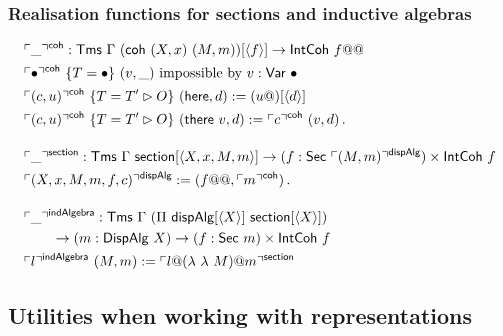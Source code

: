 \subsubsection{Realisation functions for sections and inductive algebras}

\begin{align*}
&\emb{\_}^{\mta{coh}} : \Tms\ \Gamma \ (\mta{coh}\ (X, x)\ (M, m))[\Msub f] \to \mta{IntCoh}\ f@@ \\
&\emb{\bullet}^{\mta{coh}}\ \{T = \bullet\}\ (v, \_)\text{ impossible by $v : \mta{Var}\ \bullet$} \\
&\emb{(c, u)}^{\mta{coh}}\ \{T = T' \rhd O\}\ (\mta{here}, d) := (u@)[\Msub{d}] \\
&\emb{(c, u)}^{\mta{coh}}\ \{T = T' \rhd O\}\ (\mta{there}\ v, d) := \emb{c}^{\mta{coh}}\ (v, d) \,. \\[1em]
&\emb{\_}^{\mta{section}} : \Tms\ \Gamma \ \mta{section}[\Msub{X, x, M, m}] \to (f : \mta{Sec}\ \emb{(M, m)}^{\mta{dispAlg}}) \times \mta{IntCoh}\ f \\
&\emb{(X, x, M, m, f, c)}^{\mta{dispAlg}} := (f@@, \emb{m}^{\mta{coh}}) \,. \\[1em]
&\emb{\_}^\mta{indAlgebra} : \mta{Tms}\ \Gamma\ (\Pi\ \mta{dispAlg}[\Msub X]\ \mta{section}[\Msub X]) \\ & \qquad \to (m : \mta{DispAlg}\ X) \to (f : \mta{Sec}\ m) \times  \mta{IntCoh}\ f \\
&\emb{l}^\mta{indAlgebra}\ (M, m) := \emb{l@(\lambda\ \lambda\ M)@m}^\mta{section}
\end{align*}

\subsection{Utilities when working with representations} \label{app:reprs}

